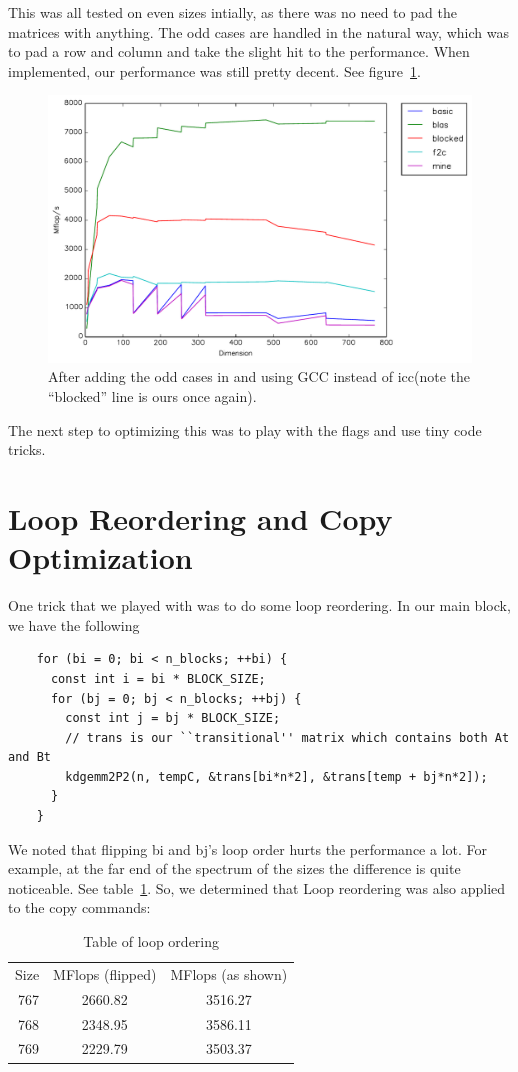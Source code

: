 \documentclass{article}
\begin{document}
  This was all tested on even sizes intially, as there was no need to pad the matrices with anything. The odd cases
  are handled in the natural way, which was to pad a row and column and take the slight hit to the performance.
  When implemented, our performance was still pretty decent. See figure~\ref{fig:odd}.

  \begin{figure}[h]
    \centering
    \includegraphics[width=.7\textwidth]{odd.pdf}
    \caption{After adding the odd cases in and using GCC instead of icc(note the ``blocked'' line is ours once again).}
    \label{fig:odd}
  \end{figure}

  The next step to optimizing this was to play with the flags and use tiny code tricks.

  \section{Loop Reordering and Copy Optimization}
    One trick that we played with was to do some loop reordering. In our main block, we have the following

    \begin{lstlisting}
    for (bi = 0; bi < n_blocks; ++bi) {
      const int i = bi * BLOCK_SIZE;
      for (bj = 0; bj < n_blocks; ++bj) {
        const int j = bj * BLOCK_SIZE;
        // trans is our ``transitional'' matrix which contains both At and Bt
        kdgemm2P2(n, tempC, &trans[bi*n*2], &trans[temp + bj*n*2]);
      }
    }
    \end{lstlisting}

    We noted that flipping bi and bj's loop order hurts the performance a lot. For example, at the far end of the spectrum of the sizes the difference is quite noticeable. See table~\ref{tab:looporder}. So, we determined that Loop reordering was also applied to the copy commands:

    \begin{table}
      \centering
      \begin{tabular}{r c c}
        Size & MFlops (flipped) & MFlops (as shown) \\
        767  & 2660.82 & 3516.27\\
        768  & 2348.95 & 3586.11\\
        769  & 2229.79 & 3503.37
      \end{tabular}
      \caption{Table of loop ordering}
      \label{tab:looporder}
    \end{table}
\end{document}
